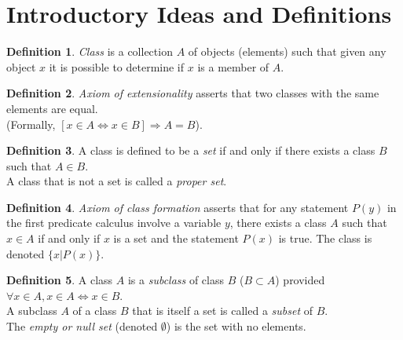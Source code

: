 \documentclass[a4paper,sfsidenotes,openany]{tufte-book}
\theoremstyle{definition}
\newtheorem{definition}{Definition}[section]
\begin{document}
\section{Introductory Ideas and Definitions}
\begin{fullwidth}

\begin{definition}
\textit{{\color{blue} Class}} is a collection $ A $ of objects (elements) such that given any object $ x $ it is possible to determine if $ x $ is a member of $ A $.\\
\end{definition}
\>

\begin{definition}
\textit{{\color{blue} Axiom of extensionality}} asserts that two classes with the same elements are equal. \\
(Formally, $ \left[x \in A \Longleftrightarrow x \in B \right] \Rightarrow A=B $).\\
\end{definition}
\>

\begin{definition}
A class is defined to be a \textit{{\color{blue} set}} if and only if there exists a class $ B $ such that $ A \in B $.\\
A class that is not a set is called a \textit{{\color{blue} proper set}}.\\
\end{definition}
\>

\begin{definition}
\textit{{\color{blue} Axiom of class formation}} asserts that for any statement $ P(y) $ in the first predicate calculus involve a variable $ y $, there exists a class $ A $ such that $ x \in A $ if and only if $ x $ is a set and the statement $ P(x) $ is true. The class is denoted 	$\{ x | P(x) \}$.\\
\end{definition}
\>

\begin{definition}
A class $ A $ is a \textit{{\color{blue} subclass}} of class $ B $ ($ B \subset A $) provided $ \forall x \in A, x \in A \Longleftrightarrow x \in B $. \\
A subclass $ A $ of a class $ B $ that is itself a set is called a \textit{{\color{blue} subset}} of $ B $.\\
The \textit{{\color{blue} empty or null set}} (denoted $\emptyset$) is the set with no elements.\\
\end{definition}
\>


\end{fullwidth}
\end{document}
